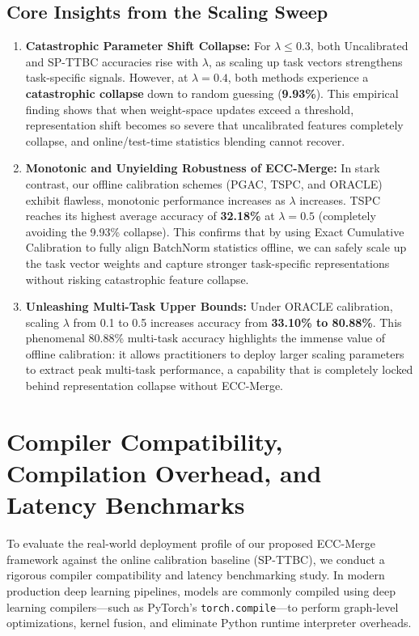 \documentclass{article}
\theoremstyle{plain}
\theoremstyle{definition}
\theoremstyle{remark}
\begin{document}
\subsection{Core Insights from the Scaling Sweep}
\begin{enumerate}
    \item \textbf{Catastrophic Parameter Shift Collapse:} For $\lambda \le 0.3$, both Uncalibrated and SP-TTBC accuracies rise with $\lambda$, as scaling up task vectors strengthens task-specific signals. However, at $\lambda = 0.4$, both methods experience a \textbf{catastrophic collapse} down to random guessing (\textbf{9.93\%}). This empirical finding shows that when weight-space updates exceed a threshold, representation shift becomes so severe that uncalibrated features completely collapse, and online/test-time statistics blending cannot recover.
    \item \textbf{Monotonic and Unyielding Robustness of ECC-Merge:} In stark contrast, our offline calibration schemes (PGAC, TSPC, and ORACLE) exhibit flawless, monotonic performance increases as $\lambda$ increases. TSPC reaches its highest average accuracy of \textbf{32.18\%} at $\lambda = 0.5$ (completely avoiding the 9.93\% collapse). This confirms that by using Exact Cumulative Calibration to fully align BatchNorm statistics offline, we can safely scale up the task vector weights and capture stronger task-specific representations without risking catastrophic feature collapse.
    \item \textbf{Unleashing Multi-Task Upper Bounds:} Under ORACLE calibration, scaling $\lambda$ from 0.1 to 0.5 increases accuracy from \textbf{33.10\% to 80.88\%}. This phenomenal 80.88\% multi-task accuracy highlights the immense value of offline calibration: it allows practitioners to deploy larger scaling parameters to extract peak multi-task performance, a capability that is completely locked behind representation collapse without ECC-Merge.
\end{enumerate}

\section{Compiler Compatibility, Compilation Overhead, and Latency Benchmarks}
\label{ap:compiler}
To evaluate the real-world deployment profile of our proposed ECC-Merge framework against the online calibration baseline (SP-TTBC), we conduct a rigorous compiler compatibility and latency benchmarking study. In modern production deep learning pipelines, models are commonly compiled using deep learning compilers—such as PyTorch's \texttt{torch.compile}—to perform graph-level optimizations, kernel fusion, and eliminate Python runtime interpreter overheads.
\end{document}
